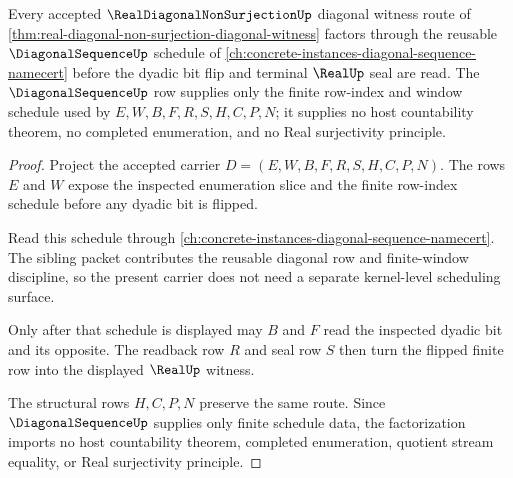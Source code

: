 \begin{theorem}
\label{thm:real-diagonal-non-surjection-diagonal-sequence-route}
Every accepted $\RealDiagonalNonSurjectionUp$ diagonal witness route of \autoref{thm:real-diagonal-non-surjection-diagonal-witness} factors through the reusable $\DiagonalSequenceUp$ schedule of \autoref{ch:concrete-instances-diagonal-sequence-namecert} before the dyadic bit flip and terminal $\RealUp$ seal are read. The $\DiagonalSequenceUp$ row supplies only the finite row-index and window schedule used by $E,W,B,F,R,S,H,C,P,N$; it supplies no host countability theorem, no completed enumeration, and no Real surjectivity principle.
\end{theorem}
\begin{proof}
Project the accepted carrier $D=(E,W,B,F,R,S,H,C,P,N)$. The rows $E$ and $W$ expose the inspected enumeration slice and the finite row-index schedule before any dyadic bit is flipped.

Read this schedule through \autoref{ch:concrete-instances-diagonal-sequence-namecert}. The sibling packet contributes the reusable diagonal row and finite-window discipline, so the present carrier does not need a separate kernel-level scheduling surface.

Only after that schedule is displayed may $B$ and $F$ read the inspected dyadic bit and its opposite. The readback row $R$ and seal row $S$ then turn the flipped finite row into the displayed $\RealUp$ witness.

The structural rows $H,C,P,N$ preserve the same route. Since $\DiagonalSequenceUp$ supplies only finite schedule data, the factorization imports no host countability theorem, completed enumeration, quotient stream equality, or Real surjectivity principle.
\end{proof}

